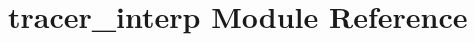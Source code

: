\hypertarget{namespacetracer__interp}{}\section{tracer\+\_\+interp Module Reference}
\label{namespacetracer__interp}
